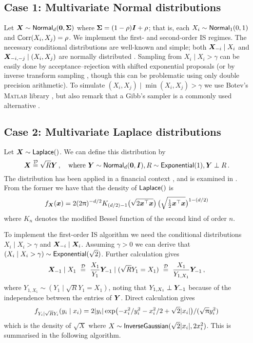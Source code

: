 \subsection*{Case 1: Multivariate Normal distributions}

Let $\bm{X} \sim \mathsf{Normal}_d(\bm{0}, \bm{\Sigma})$ where $\bm{\Sigma} = (1-\rho) \bm{I} + \rho$; that is, each $X_i \sim \mathsf{Normal}_1(0,1)$ and $\operatorname{\mathbb{C}\mathrm{orr}}(X_i,X_j)=\rho$. We implement the first- and second-order IS regimes. The necessary conditional distributions are well-known and simple; both $\bm{X}_{-i} \mid X_i$ and $\bm{X}_{-i,-j} \mid (X_i, X_j)$ are normally distributed \cite{anderson2003introduction}.
Sampling from $X_i \mid X_i > \gamma$ can be easily done by acceptance--rejection with shifted exponential proposals \cite{robert1995simulation} (or by inverse transform sampling \cite[Remark 2.4]{asmussen2007stochastic}, though this can be problematic using only double precision arithmetic). To simulate $(X_i,X_j) \mid \min(X_i, X_j)>\gamma$ we use Botev's \textsc{Matlab} library \cite{botev2017normal}, but also remark that a Gibb's sampler is a commonly used alternative \cite{breslaw1994random,robert1995simulation}.


\subsection*{Case 2: Multivariate Laplace distributions} \label{scn:laplace}

Let $\bm{X} \sim \mathsf{Laplace}()$. We can define this distribution by
\[ \bm{X} \stackrel{\smash{\mathcal{D}}}{=} \sqrt{R} \bm{Y} \,, \quad \text{where } \bm{Y} \sim \mathsf{Normal}_d(\bm{0},\bm{I}), R \sim \mathsf{Exponential}(1), \bm{Y} \perp R \,.
\]
The distribution has been applied in a financial context \cite{huang2003rare}, and is examined in
\cite{eltoft2006multivariate,kotz2001asymmetric}. From the former we have that the density of $\mathsf{Laplace}()$ is
\[
f_{\bm{X}}(\bm{x}) = 2 (2 \uppi)^{-d/2}  K_{(d/2) -1} \bigl( \sqrt{2 \bm{x}^\top \bm{x}} \bigr) \,
 \bigl(\sqrt{\tfrac{1}{2} \bm{x}^\top \bm{x}}\bigr)^{1-(d/2)}
\]
where $K_n$ denotes the modified Bessel function of the second kind of order $n$.

To implement the first-order IS algorithm we need the conditional distributions $X_i \mid X_i > \gamma$ and
$\bm{X}_{-i} \mid \bm{X}_i$.
Assuming $\gamma > 0$ we can derive that $(X_i \mid X_i > \gamma) \sim \mathsf{Exponential}(\sqrt{2})$.
Further calculation gives
\[
\bm{X}_{-1} \mid X_1 \ \stackrel{\smash{\mathcal{D}}}{=}\ \frac{X_1}{Y_1} \bm{Y}_{-1} \mid (\sqrt{R} Y_1 = X_1) \ \stackrel{\smash{\mathcal{D}}}{=}\
\frac{X_1}{Y_{1,X_1}} \bm{Y}_{-1} \,,
\]
where $Y_{1,X_1} \sim (Y_1 \mid \sqrt{R} Y_1 = X_1)$, noting that $Y_{1,X_1} \perp \bm{Y}_{-1}$ because of the independence between the entries of $\bm{Y}$. Direct calculation gives
\[
f_{Y_i \mid \sqrt{R} Y_i}(y_i \mid x_i) =
 2 \lvert y_i\rvert \exp\bigl(
   -x_i^2 / y_i^2 - x_i^2 / 2 + \sqrt{2} \lvert x_i\rvert \bigr) / (\sqrt{\uppi } y_i^2)
\]
which is the density of $\sqrt{X}$ where
$X \sim \mathsf{InverseGaussian}(\sqrt{2} \lvert x_i\rvert, 2 x_i^2)$.
This is summarised in the following algorithm.

